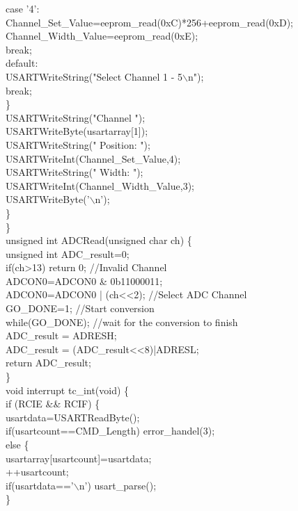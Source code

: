 \tabto*{1.5cm} case '4':\\
\tabto*{2cm} Channel\_Set\_Value=eeprom\_read(0xC)*256+eeprom\_read(0xD);\\
\tabto*{2cm} Channel\_Width\_Value=eeprom\_read(0xE);\\
\tabto*{2cm} break;\\
\tabto*{1.5cm} default:\\
\tabto*{2cm} USARTWriteString("Select Channel 1 - 5$\backslash$n");\\
\tabto*{2cm} break;\\
\tabto*{1cm} \}\\
\tabto*{1cm}USARTWriteString("Channel ");\\
\tabto*{1cm}USARTWriteByte(usartarray[1]);\\
\tabto*{1cm}USARTWriteString(" Position: ");\\
\tabto*{1cm}USARTWriteInt(Channel\_Set\_Value,4);\\
\tabto*{1cm}USARTWriteString(" Width: ");\\
\tabto*{1cm}USARTWriteInt(Channel\_Width\_Value,3);\\
\tabto*{1cm}USARTWriteByte('$\backslash$n');\\
\tabto*{.5cm} \}\\
\}\\
unsigned int ADCRead(unsigned char ch) \{\\
\tabto*{.5cm}	unsigned int ADC\_result=0;\\	
\tabto*{.5cm}	if(ch>13) return 0;  \tabto*{7.5cm}//Invalid Channel\\	
\tabto*{.5cm}	ADCON0=ADCON0 \& 0b11000011;\\	
\tabto*{.5cm}	ADCON0=ADCON0 | (ch<<2); \tabto*{7.5cm}  //Select ADC Channel	\\
\tabto*{.5cm}	GO\_DONE=1; \tabto*{7.5cm} //Start conversion\\	
\tabto*{.5cm}	while(GO\_DONE); \tabto*{7.5cm} //wait for the conversion to finish	\\
\tabto*{.5cm}	ADC\_result = ADRESH;	\\
\tabto*{.5cm}	ADC\_result = (ADC\_result<<8)|ADRESL;	\\
\tabto*{.5cm}	return ADC\_result;\\
\}\\
void interrupt tc\_int(void) \{\\
\tabto*{.5cm} if (RCIE \&\& RCIF) \{\\
\tabto*{1cm} usartdata=USARTReadByte();\\
\tabto*{1cm} if(usartcount==CMD\_Length) error\_handel(3);\\
\tabto*{1cm} else \{\\
\tabto*{1.5cm} usartarray[usartcount]=usartdata;\\
\tabto*{1.5cm} ++usartcount;\\
\tabto*{1.5cm} if(usartdata=='$\backslash$n') usart\_parse();\\
\tabto*{1cm} \}\\

